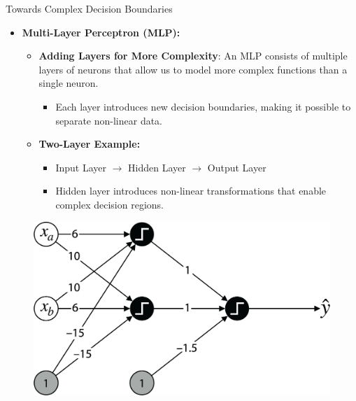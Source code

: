 \documentclass[serif, aspectratio=169]{beamer}
\begin{document}
\begin{frame}{Towards Complex Decision Boundaries}
    \begin{itemize}
        \item \textbf{Multi-Layer Perceptron (MLP):}
        \medskip
        \begin{itemize}\itemsep1em
            \item \justifying \textbf{Adding Layers for More Complexity}:
            An MLP consists of multiple layers of neurons that allow us to model more complex functions than a single neuron.
            \begin{itemize}
                \item \justifying Each layer introduces new decision boundaries, making it possible to separate non-linear data.
            \end{itemize}
            \item \justifying \textbf{Two-Layer Example:}
            \begin{itemize}
                \item Input Layer $\rightarrow$ Hidden Layer $\rightarrow$ Output Layer
                \item Hidden layer introduces non-linear transformations that enable complex decision regions.
            \end{itemize}
        \end{itemize}
    \end{itemize}
    \begin{figure}
        \centering
        \includegraphics[width=0.38\linewidth]{pic/Figure_21.png}
    \end{figure}
    \vfill
\end{frame}
\end{document}
